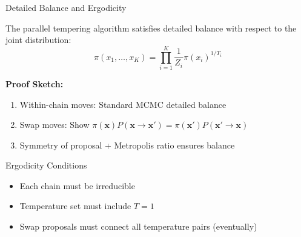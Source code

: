 \documentclass[aspectratio=169]{beamer}
\begin{document}
\begin{frame}{Detailed Balance and Ergodicity}
\begin{proposition}
The parallel tempering algorithm satisfies detailed balance with respect to the joint distribution:
$$\pi(x_1, \ldots, x_K) = \prod_{i=1}^K \frac{1}{Z_i} \pi(x_i)^{1/T_i}$$
\end{proposition}

\textbf{Proof Sketch:}
\begin{enumerate}
    \item Within-chain moves: Standard MCMC detailed balance
    \item Swap moves: Show $\pi(\mathbf{x}) P(\mathbf{x} \to \mathbf{x}') = \pi(\mathbf{x}') P(\mathbf{x}' \to \mathbf{x})$
    \item Symmetry of proposal + Metropolis ratio ensures balance
\end{enumerate}

\begin{block}{Ergodicity Conditions}
\begin{itemize}
    \item Each chain must be irreducible
    \item Temperature set must include $T = 1$
    \item Swap proposals must connect all temperature pairs (eventually)
\end{itemize}
\end{block}
\end{frame}
\end{document}
